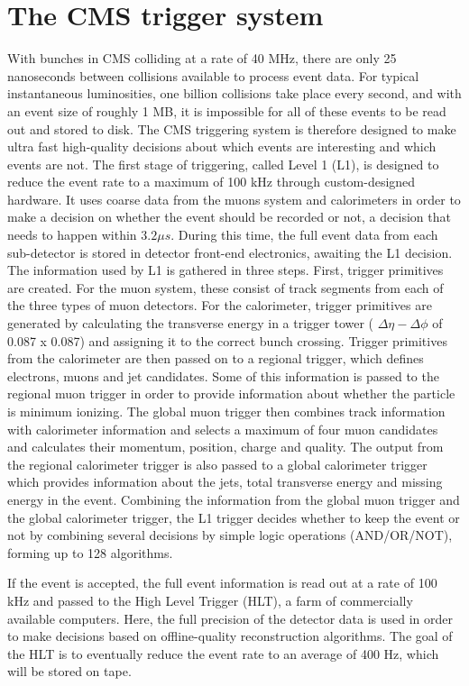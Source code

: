 \section{The CMS trigger system}
With bunches in CMS colliding at a rate of 40 MHz, there are only 25 nanoseconds between collisions available to process event data. For typical instantaneous luminosities, one billion collisions take place every second, and with an event size of roughly 1 MB, it is impossible for all of these events to be read out and stored to disk. The CMS triggering system is therefore designed to make ultra fast high-quality decisions about which events are interesting and which events are not.
The first stage of triggering, called Level 1 (L1), is designed to reduce the event rate to a maximum of 100 kHz through custom-designed hardware. It uses coarse data from the muons system and calorimeters in order to make a decision on whether the event should be recorded or not, a decision that needs to happen within $3.2 \mu s$. During this time, the full event data from each sub-detector is stored in detector front-end electronics, awaiting the L1 decision. The information used by L1 is gathered in three steps. First, trigger primitives are created. For the muon system, these consist of track segments from each of the three types of muon detectors. For the calorimeter, trigger primitives are generated by calculating the transverse energy in a trigger tower ( $\Delta \eta- \Delta \phi$ of 0.087 x 0.087) and assigning it to the correct bunch crossing. Trigger primitives from the calorimeter are then passed on to a regional trigger, which defines electrons, muons and jet candidates. Some of this information is passed to the regional muon trigger in order to provide information about whether the particle is minimum ionizing. The global muon trigger then combines track information with calorimeter information and selects a maximum of four muon candidates and calculates their momentum, position, charge and quality. The output from the regional calorimeter trigger is also passed to a global calorimeter trigger which provides information about the jets, total transverse energy and missing energy in the event. Combining the information from the global muon trigger and the global calorimeter trigger, the L1 trigger decides whether to keep the event or not by combining several decisions by simple logic operations (AND/OR/NOT), forming up to 128 algorithms.

If the event is accepted, the full event information is read out at a rate of 100 kHz and passed to the High Level Trigger (HLT), a farm of commercially available computers. Here, the full precision of the detector data is used in order to make decisions based on offline-quality reconstruction algorithms. The goal of the HLT is to eventually reduce the event rate to an average of 400 Hz, which will be stored on tape.
